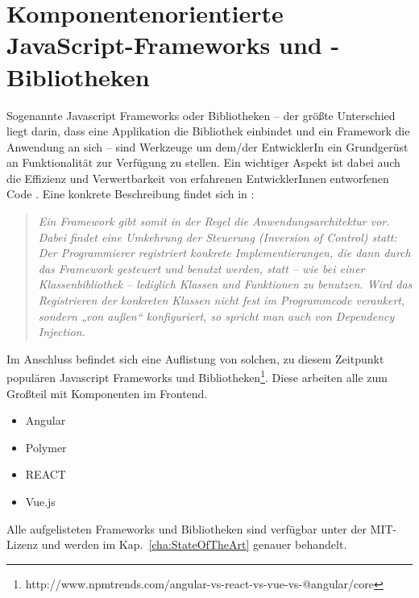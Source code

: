 \section{Komponentenorientierte JavaScript-Frameworks und -Bibliotheken}
Sogenannte Javascript Frameworks oder Bibliotheken -- der größte Unterschied liegt darin, dass eine Applikation die Bibliothek einbindet und ein Framework die Anwendung an sich -- sind Werkzeuge um dem/der EntwicklerIn ein Grundgerüst an Funktionalität zur Verfügung zu stellen. Ein wichtiger Aspekt ist dabei auch die Effizienz und Verwertbarkeit von erfahrenen EntwicklerInnen entworfenen Code \cite{js-frameworks}.
Eine konkrete Beschreibung findet sich in \cite{wiki-framework}: 
\begin{quote}\textit{Ein Framework gibt somit in der Regel die Anwendungsarchitektur vor. Dabei findet eine Umkehrung der Steuerung (Inversion of Control) statt: Der Programmierer registriert konkrete Implementierungen, die dann durch das Framework gesteuert und benutzt werden, statt – wie bei einer Klassenbibliothek – lediglich Klassen und Funktionen zu benutzen. Wird das Registrieren der konkreten Klassen nicht fest im Programmcode verankert, sondern „von außen“ konfiguriert, so spricht man auch von Dependency Injection.}
\end{quote}

Im Anschluss befindet sich eine Auflistung von solchen, zu diesem Zeitpunkt populären Javascript Frameworks und Bibliotheken\footnote{http://www.npmtrends.com/angular-vs-react-vs-vue-vs-@angular/core}. Diese arbeiten alle zum Großteil mit Komponenten im Frontend.
\begin{itemize}  
	\item Angular
	\item Polymer
	\item REACT
	\item Vue.js
\end{itemize}
Alle aufgelisteten Frameworks und Bibliotheken sind verfügbar unter der MIT-Lizenz und werden im Kap.~\ref{cha:StateOfTheArt} genauer behandelt.